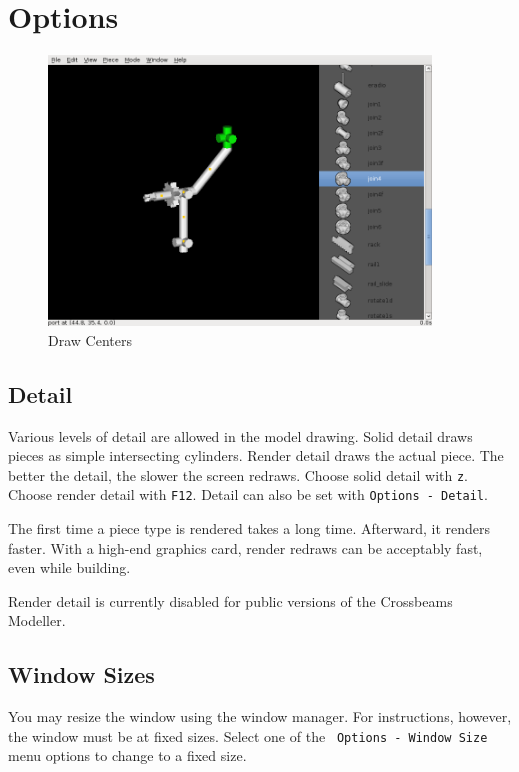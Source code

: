 \documentclass[12pt]{report}
\begin{document}
\section{Options}

\begin{figure}[h]
\begin{center}
\includegraphics[width=4.0in]{doc_images/manual_centers.png}
\caption{Draw Centers}
\label{DrawCenters}
\end{center}
\end{figure}

\subsection{Detail}

Various levels of detail are allowed in the model drawing.  Solid
detail draws pieces as simple intersecting cylinders.  Render detail
draws the actual piece.  The better the detail, the slower the screen
redraws.  Choose solid detail with {\tt z}.  Choose render detail with
{\tt F12}.  Detail can also be set with {\tt Options - Detail}.

The first time a piece type is rendered takes a long time.  Afterward,
it renders faster.  With a high-end graphics card, render redraws can
be acceptably fast, even while building.

Render detail is currently disabled for public versions of the
Crossbeams Modeller.

\subsection{Window Sizes}

You may resize the window using the window manager.  For instructions,
however, the window must be at fixed sizes.  Select one of the {\tt
  Options - Window Size} menu options to change to a fixed size.
\end{document}

